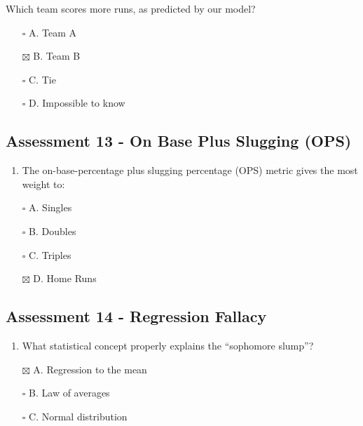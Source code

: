 \documentclass[
]{article}
\providecommand{\tightlist}{%
  \setlength{\itemsep}{0pt}\setlength{\parskip}{0pt}}
\begin{document}
Which team scores more runs, as predicted by our model?

\begin{itemize}
\tightlist
\item[$\square$]
  A. Team A
\item[$\boxtimes$]
  B. Team B
\item[$\square$]
  C. Tie
\item[$\square$]
  D. Impossible to know
\end{itemize}

\hypertarget{assessment-13---on-base-plus-slugging-ops}{%
\subsection{Assessment 13 - On Base Plus Slugging
(OPS)}\label{assessment-13---on-base-plus-slugging-ops}}

\begin{enumerate}
\def\labelenumi{\arabic{enumi}.}
\tightlist
\item
  The on-base-percentage plus slugging percentage (OPS) metric gives the
  most weight to:
\end{enumerate}

\begin{itemize}
\tightlist
\item[$\square$]
  A. Singles
\item[$\square$]
  B. Doubles
\item[$\square$]
  C. Triples
\item[$\boxtimes$]
  D. Home Runs
\end{itemize}

\hypertarget{assessment-14---regression-fallacy}{%
\subsection{Assessment 14 - Regression
Fallacy}\label{assessment-14---regression-fallacy}}

\begin{enumerate}
\def\labelenumi{\arabic{enumi}.}
\tightlist
\item
  What statistical concept properly explains the ``sophomore slump''?
\end{enumerate}

\begin{itemize}
\tightlist
\item[$\boxtimes$]
  A. Regression to the mean
\item[$\square$]
  B. Law of averages
\item[$\square$]
  C. Normal distribution
\end{itemize}
\end{document}
